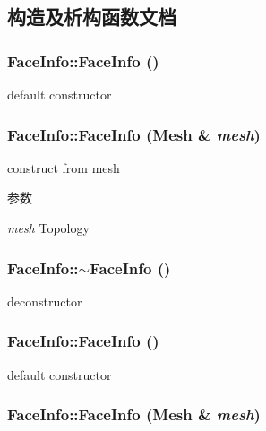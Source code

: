 \subsection{构造及析构函数文档}
\hypertarget{classFaceInfo_aaffd1ea3649f3615951ba1afed75c78e}{
\subsubsection[{FaceInfo}]{\setlength{\rightskip}{0pt plus 5cm}FaceInfo::FaceInfo ()}}
\label{classFaceInfo_aaffd1ea3649f3615951ba1afed75c78e}


default constructor \hypertarget{classFaceInfo_a16c57584efc83ad350316d63a4bec29d}{
\subsubsection[{FaceInfo}]{\setlength{\rightskip}{0pt plus 5cm}FaceInfo::FaceInfo (Mesh \& {\em mesh})}}
\label{classFaceInfo_a16c57584efc83ad350316d63a4bec29d}


construct from mesh 
\begin{DoxyParams}{参数}
\item[{\em mesh}]Topology \end{DoxyParams}
\hypertarget{classFaceInfo_adc5fc3ff520ec912c4edc313015e22ca}{
\subsubsection[{$\sim$FaceInfo}]{\setlength{\rightskip}{0pt plus 5cm}FaceInfo::$\sim$FaceInfo ()}}
\label{classFaceInfo_adc5fc3ff520ec912c4edc313015e22ca}


deconstructor \hypertarget{classFaceInfo_aaffd1ea3649f3615951ba1afed75c78e}{
\subsubsection[{FaceInfo}]{\setlength{\rightskip}{0pt plus 5cm}FaceInfo::FaceInfo ()}}
\label{classFaceInfo_aaffd1ea3649f3615951ba1afed75c78e}


default constructor \hypertarget{classFaceInfo_a16c57584efc83ad350316d63a4bec29d}{
\subsubsection[{FaceInfo}]{\setlength{\rightskip}{0pt plus 5cm}FaceInfo::FaceInfo (Mesh \& {\em mesh})}}
\label{classFaceInfo_a16c57584efc83ad350316d63a4bec29d}


